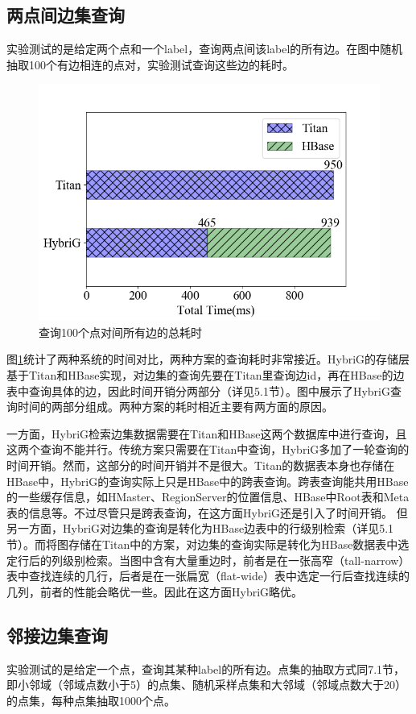 \subsection{两点间边集查询}
实验测试的是给定两个点和一个label，查询两点间该label的所有边。在图中随机抽取100个有边相连的点对，实验测试查询这些边的耗时。

\begin{figure}[htbp]
\centering
\includegraphics[width=120mm]{fig/edge_query_perf.png}
\caption{查询100个点对间所有边的总耗时}
\label{fig:edge_query_perf}
\end{figure}

图\ref{fig:edge_query_perf}统计了两种系统的时间对比，两种方案的查询耗时非常接近。HybriG的存储层基于Titan和HBase实现，对边集的查询先要在Titan里查询边id，再在HBase的边表中查询具体的边，因此时间开销分两部分（详见5.1节）。图中展示了HybriG查询时间的两部分组成。两种方案的耗时相近主要有两方面的原因。

一方面，HybriG检索边集数据需要在Titan和HBase这两个数据库中进行查询，且这两个查询不能并行。传统方案只需要在Titan中查询，HybriG多加了一轮查询的时间开销。然而，这部分的时间开销并不是很大。Titan的数据表本身也存储在HBase中，HybriG的查询实际上只是HBase中的跨表查询。跨表查询能共用HBase的一些缓存信息，如HMaster、RegionServer的位置信息、HBase中Root表和Meta表的信息等。不过尽管只是跨表查询，在这方面HybriG还是引入了时间开销。
但另一方面，HybriG对边集的查询是转化为HBase边表中的行级别检索（详见5.1节）。而将图存储在Titan中的方案，对边集的查询实际是转化为HBase数据表中选定行后的列级别检索。当图中含有大量重边时，前者是在一张高窄（tall-narrow）表中查找连续的几行，后者是在一张扁宽（flat-wide）表中选定一行后查找连续的几列，前者的性能会略优一些。因此在这方面HybriG略优。


\subsection{邻接边集查询}
实验测试的是给定一个点，查询其某种label的所有边。点集的抽取方式同7.1节，即小邻域（邻域点数小于5）的点集、随机采样点集和大邻域（邻域点数大于20）的点集，每种点集抽取1000个点。

